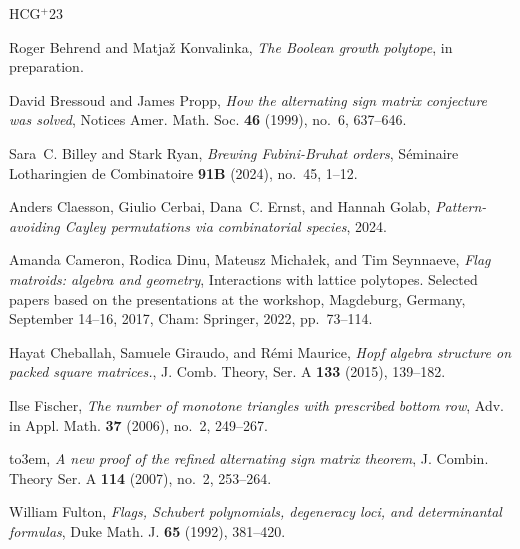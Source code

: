 \documentclass[12pt]{amsart}
\numberwithin{equation}{section}
\theoremstyle{definition}
\begin{document}

\newcommand{\etalchar}[1]{$^{#1}$}
\providecommand{\bysame}{\leavevmode\hbox to3em{\hrulefill}\thinspace}
\providecommand{\MR}{\relax\ifhmode\unskip\space\fi MR }
\providecommand{\MRhref}[2]{%
  \href{http://www.ams.org/mathscinet-getitem?mr=#1}{#2}
}
\providecommand{\href}[2]{#2}
\begin{thebibliography}{HCG{\etalchar{+}}23}

Roger Behrend and Matja{\v z} Konvalinka, \emph{The {B}oolean growth polytope},
  in preparation.

David Bressoud and James Propp, \emph{How the alternating sign matrix
  conjecture was solved}, Notices Amer. Math. Soc. \textbf{46} (1999), no.~6,
  637--646.

Sara~C. Billey and Stark Ryan, \emph{Brewing {F}ubini-{B}ruhat orders},
  S\'eminaire Lotharingien de Combinatoire \textbf{91B} (2024), no.~45, 1--12.

Anders Claesson, Giulio Cerbai, Dana~C. Ernst, and Hannah Golab,
  \emph{Pattern-avoiding {Cayley} permutations via combinatorial species},
  2024.

Amanda Cameron, Rodica Dinu, Mateusz Micha{\l}ek, and Tim Seynnaeve, \emph{Flag
  matroids: algebra and geometry}, Interactions with lattice polytopes.
  Selected papers based on the presentations at the workshop, Magdeburg,
  Germany, September 14--16, 2017, Cham: Springer, 2022, pp.~73--114.

Hayat Cheballah, Samuele Giraudo, and R{\'e}mi Maurice, \emph{Hopf algebra
  structure on packed square matrices.}, J. Comb. Theory, Ser. A \textbf{133}
  (2015), 139--182.

Ilse Fischer, \emph{The number of monotone triangles with prescribed bottom
  row}, Adv. in Appl. Math. \textbf{37} (2006), no.~2, 249--267.

\bysame, \emph{A new proof of the refined alternating sign matrix theorem}, J.
  Combin. Theory Ser. A \textbf{114} (2007), no.~2, 253--264.

William Fulton, \emph{{Flags, {S}chubert polynomials, degeneracy loci, and
  determinantal formulas}}, Duke Math. J. \textbf{65} (1992), 381--420.


\end{thebibliography}
\end{document}
